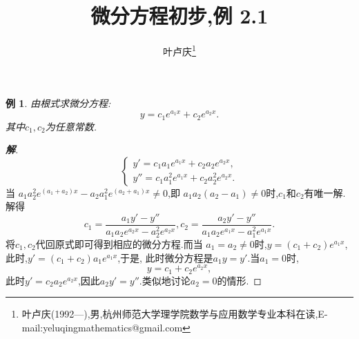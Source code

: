 \documentclass[a4paper]{article}
\newtheorem*{exam}{例}
\newenvironment{example}
{\bigskip\begin{mdframed}\begin{exam}}
    {\end{exam}\end{mdframed}\bigskip}
\begin{document}
\title{\huge{\bf{微分方程初步,例 2.1}}} \author{\small{叶卢庆\footnote{叶卢庆(1992---),男,杭州师范大学理学院数学与应用数学专业本科在读,E-mail:yeluqingmathematics@gmail.com}}}
\maketitle
\begin{example}
由根式求微分方程:
$$
y=c_1e^{a_1x}+c_2e^{a_2x}.
$$
其中$c_1,c_2$为任意常数.
\end{example}
\begin{proof}[\textbf{解}]
$$
\begin{cases}
  y'=c_1a_1e^{a_1x}+c_2a_2e^{a_2x},\\
y''=c_1a_1^2e^{a_1x}+c_2a_2^2e^{a_2x}.
\end{cases}
$$
当 $a_1a_2^{2}e^{(a_1+a_{2})x}-a_2a_{1}^{2}e^{(a_2+a_{1})x}\neq 0$,即
$a_1a_2(a_2-a_1)\neq 0$时,$c_1$和$c_2$有唯一解.解得
$$
c_1=\frac{a_1y'-y''}{a_1a_2e^{a_2x}-a_2^2e^{a_2x}},c_2=\frac{a_2y'-y''}{a_1a_2e^{a_1x}-a_1^2e^{a_1x}}.
$$
将$c_1,c_2$代回原式即可得到相应的微分方程.而当
$a_1=a_2\neq 0$时,$y=(c_1+c_2)e^{a_1x}$,此时,$y'=(c_1+c_2)a_1e^{a_1x}$,于是,
此时微分方程是$a_1y=y'$.当$a_1=0$时,
$$
y=c_1+c_2e^{a_2x},
$$
此时$y'=c_2a_2e^{a_2x}$,因此$a_2y'=y''$.类似地讨论$a_2=0$的情形.
\end{proof}
\end{document}
